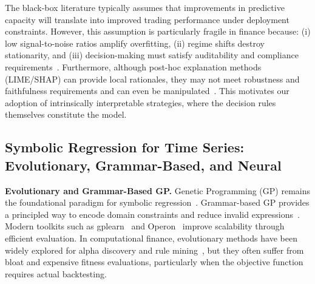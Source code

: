 The black-box literature typically assumes that improvements in predictive capacity will translate into improved trading performance under deployment constraints. However, this assumption is particularly fragile in finance because: (i) low signal-to-noise ratios amplify overfitting, (ii) regime shifts destroy stationarity, and (iii) decision-making must satisfy auditability and compliance requirements~\cite{eu2014mifid,weber2024comprehensive,cAo2022ai}. Furthermore, although post-hoc explanation methods (LIME/SHAP) can provide local rationales, they may not meet robustness and faithfulness requirements and can even be manipulated~\cite{ribeiro2016should,lundberg2017unified,slack2020fooling}. This motivates our adoption of intrinsically interpretable strategies, where the decision rules themselves constitute the model.

\subsection{Symbolic Regression for Time Series: Evolutionary, Grammar-Based, and Neural}

\textbf{Evolutionary and Grammar-Based GP.} Genetic Programming (GP) remains the foundational paradigm for symbolic regression~\cite{koza1994genetic,poli2008field}. Grammar-based GP provides a principled way to encode domain constraints and reduce invalid expressions~\cite{mckay2010grammar}. Modern toolkits such as gplearn~\cite{stephens2016gplearn} and Operon~\cite{burlacu2020operon} improve scalability through efficient evaluation. In computational finance, evolutionary methods have been widely explored for alpha discovery and rule mining~\cite{chen2002genetic}, but they often suffer from bloat and expensive fitness evaluations, particularly when the objective function requires actual backtesting.

